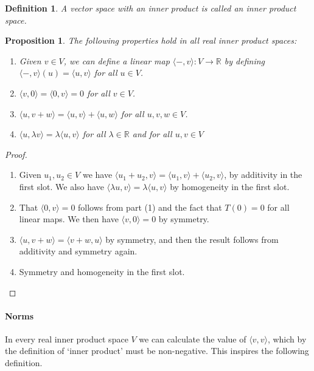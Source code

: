 \documentclass{article}
\theoremstyle{plain}
\newtheorem{proposition}[theorem]{Proposition}{\bfseries}{\itshape}
\newtheorem{definition}[theorem]{Definition}{\bfseries}{\upshape}
\newcommand{\bR}{\mathbb{R}}
\begin{document}
\begin{definition}
A vector space with an inner product is called an \emph{inner product space}.  
\end{definition}

\begin{proposition}\label{P:LA4inner}
The following properties hold in all real inner product spaces:
\begin{enumerate}
\item Given $v\in V$, we can define a linear map $\langle -, v\rangle:V\to \bR$ by defining $\langle -, v\rangle(u) = \langle u, v\rangle$ for all $u\in V$.
\item $\langle v, 0 \rangle = \langle 0 , v\rangle = 0$ for all $v\in V$.
\item $\langle u, v+w\rangle = \langle u, v\rangle + \langle u, w\rangle$ for all $u,v,w\in V$. 
\item $\langle u,\lambda v\rangle   = \lambda\langle u,v\rangle  $ for all $\lambda\in \bR$ and for all $u,v\in V$
\end{enumerate}
\end{proposition}
\begin{proof}
\mbox{}
\begin{enumerate}
\item Given $u_1,u_2\in V$ we have $\langle u_1+u_2, v\rangle = \langle u_1, v\rangle + \langle u_2, v\rangle$, by additivity in the first slot. We also have $\langle \lambda u,v\rangle = \lambda \langle u, v \rangle$ by homogeneity in the first slot.
\item That $\langle 0 , v\rangle = 0 $ follows from part (1) and the fact that $T(0)= 0$ for all linear maps. We then have $\langle v , 0\rangle = 0$ by symmetry.
\item $\langle u, v+w\rangle = \langle v+w, u\rangle$ by symmetry, and then the result follows from additivity and symmetry again.
\item Symmetry and homogeneity in the first slot.
\end{enumerate}
\end{proof}

\paragraph{Norms}

In every real inner product space $V$ we can calculate the value of $\langle v, v\rangle$, which by the definition of `inner product'  must be non-negative. This inspires the following definition.
\end{document}
